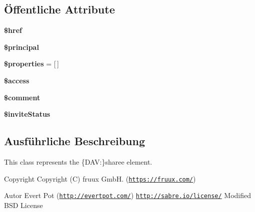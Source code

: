 \subsection*{Öffentliche Attribute}
\begin{DoxyCompactItemize}
\item 
\mbox{\label{class_sabre_1_1_d_a_v_1_1_xml_1_1_element_1_1_sharee_a5344eb606f3bdf7fd50c5fbea223abce}} 
{\bfseries \$href}
\item 
\mbox{\label{class_sabre_1_1_d_a_v_1_1_xml_1_1_element_1_1_sharee_a206e3313f76b046941eb341e1c81af42}} 
{\bfseries \$principal}
\item 
\mbox{\label{class_sabre_1_1_d_a_v_1_1_xml_1_1_element_1_1_sharee_a3f9067d0ffcfb280b1d85e478afc87c9}} 
{\bfseries \$properties} = \mbox{[}$\,$\mbox{]}
\item 
\mbox{\label{class_sabre_1_1_d_a_v_1_1_xml_1_1_element_1_1_sharee_ad48795ed4915ab17137ef373a506df85}} 
{\bfseries \$access}
\item 
\mbox{\label{class_sabre_1_1_d_a_v_1_1_xml_1_1_element_1_1_sharee_a0004ba2defae379e0699e8e1f67c10a7}} 
{\bfseries \$comment}
\item 
\mbox{\label{class_sabre_1_1_d_a_v_1_1_xml_1_1_element_1_1_sharee_a7c0f119dcefd61c48b0b3f7d0a0b9598}} 
{\bfseries \$invite\+Status}
\end{DoxyCompactItemize}


\subsection{Ausführliche Beschreibung}
This class represents the \{D\+AV\+:\}sharee element.

\begin{DoxyCopyright}{Copyright}
Copyright (C) fruux GmbH. (\href{https://fruux.com/}{\tt https\+://fruux.\+com/}) 
\end{DoxyCopyright}
\begin{DoxyAuthor}{Autor}
Evert Pot (\href{http://evertpot.com/}{\tt http\+://evertpot.\+com/})  \href{http://sabre.io/license/}{\tt http\+://sabre.\+io/license/} Modified B\+SD License 
\end{DoxyAuthor}


